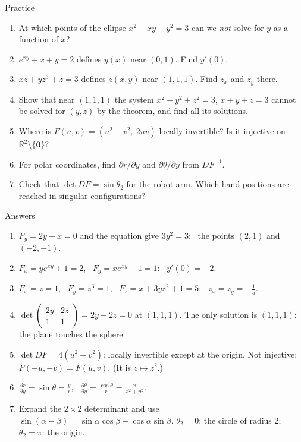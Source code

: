 \documentclass[10pt]{wosm-slides}
\newcommand{\R}{\mathbb{R}}
\begin{document}
\begin{frame}{Practice}
  \small
  \begin{enumerate}
    \item At which points of the ellipse $x^2 - xy + y^2 = 3$ can we \emph{not} solve for $y$ as a function
      of $x$?
    \item $e^{xy} + x + y = 2$ defines $y(x)$ near $(0, 1)$. Find $y'(0)$.
    \item $xz + yz^3 + z = 3$ defines $z(x, y)$ near $(1, 1, 1)$. Find $z_x$ and $z_y$ there.
    \item Show that near $(1, 1, 1)$ the system $x^2 + y^2 + z^2 = 3$, $x + y + z = 3$ cannot be solved for
      $(y, z)$ by the theorem, and find all its solutions.
    \item Where is $F(u, v) = (u^2 - v^2, \ 2uv)$ locally invertible? Is it injective on
      $\R^2 \setminus \{\mathbf 0\}$?
    \item For polar coordinates, find $\partial r / \partial y$ and $\partial\theta / \partial y$ from $DF^{-1}$.
    \item Check that $\det DF = \sin\theta_2$ for the robot arm. Which hand positions are reached in
      singular configurations?
  \end{enumerate}
\end{frame}

\begin{frame}{Answers}
  \small
  \begin{enumerate}
    \item $F_y = 2y - x = 0$ and the equation give $3y^2 = 3$: \ the points $(2, 1)$ and $(-2, -1)$.
    \item $F_x = ye^{xy} + 1 = 2$, \ $F_y = xe^{xy} + 1 = 1$: \ $y'(0) = -2$.
    \item $F_x = z = 1$, \ $F_y = z^3 = 1$, \ $F_z = x + 3yz^2 + 1 = 5$: \ $z_x = z_y = -\frac15$.
    \item $\det\begin{pmatrix} 2y & 2z \\ 1 & 1 \end{pmatrix} = 2y - 2z = 0$ at $(1, 1, 1)$. The only solution is
      $(1, 1, 1)$: the plane touches the sphere.
    \item $\det DF = 4(u^2 + v^2)$: locally invertible except at the origin. Not injective:
      $F(-u, -v) = F(u, v)$. (It is $z \mapsto z^2$.)
    \item $\frac{\partial r}{\partial y} = \sin\theta = \frac yr$, \ $\frac{\partial\theta}{\partial y} = \frac{\cos\theta}{r} = \frac{x}{x^2 + y^2}$.
    \item Expand the $2 \times 2$ determinant and use $\sin(\alpha - \beta) = \sin\alpha\cos\beta - \cos\alpha\sin\beta$.
      $\theta_2 = 0$: the circle of radius $2$; \ $\theta_2 = \pi$: the origin.
  \end{enumerate}
\end{frame}
\end{document}
